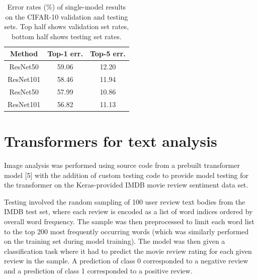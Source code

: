 \documentclass[sigplan]{acmart}
\begin{document}
\begin{table}
  \caption{Error rates (\%) of single-model results on the CIFAR-10 validation and testing sets. Top half shows validation set rates, bottom half shows testing set rates.}
  \label{tab:errStd}
  \begin{tabular}{ccc}
    \toprule
    Method & Top-1 err. & Top-5 err. \\
    \midrule
    ResNet50 & 59.06 & 12.20 \\
    ResNet101 & 58.46 & 11.94 \\
    \midrule
    ResNet50 & 57.99 & 10.86 \\
    ResNet101 & 56.82 & 11.13 \\
    \bottomrule
  \end{tabular}
\end{table}

\section{Transformers for text analysis}

Image analysis was performed using source code from a prebuilt transformer model [5] with the addition of custom testing code to provide model testing for the transformer on the Keras-provided IMDB movie review sentiment data set.

Testing involved the random sampling of 100 user review text bodies from the IMDB test set, where each review is encoded as a list of word indices ordered by overall word frequency. The sample was then preprocessed to limit each word list to the top 200 most frequently occurring words (which was similarly performed on the training set during model training). The model was then given a classification task where it had to predict the movie review rating for each given review in the sample. A prediction of class 0 corresponded to a negative review and a prediction of class 1 corresponded to a positive review.
\end{document}
